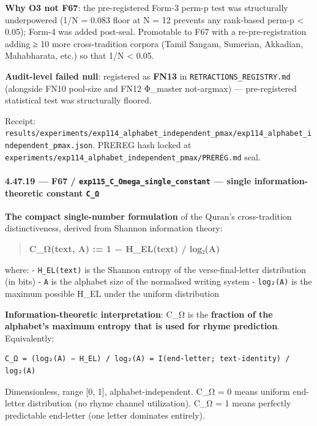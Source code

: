\documentclass[
]{article}
\begin{document}
\textbf{Why O3 not F67}: the pre-registered Form-3 perm-p test was
structurally underpowered (1/N = 0.083 floor at N = 12 prevents any
rank-based perm-p \textless{} 0.05); Form-4 was added post-seal.
Promotable to F67 with a re-pre-registration adding ≥ 10 more
cross-tradition corpora (Tamil Sangam, Sumerian, Akkadian, Mahabharata,
etc.) so that 1/N \textless{} 0.05.

\textbf{Audit-level failed null}: registered as \textbf{FN13} in
\texttt{RETRACTIONS\_REGISTRY.md} (alongside FN10 pool-size and FN12
Φ\_master not-argmax) --- pre-registered statistical test was
structurally floored.

Receipt:
\texttt{results/experiments/exp114\_alphabet\_independent\_pmax/exp114\_alphabet\_independent\_pmax.json}.
PREREG hash locked at
\texttt{experiments/exp114\_alphabet\_independent\_pmax/PREREG.md} seal.

\paragraph{\texorpdfstring{4.47.19 --- F67 /
\texttt{exp115\_C\_Omega\_single\_constant} --- single
information-theoretic constant
\texttt{C\_Ω}}{4.47.19 --- F67 / exp115\_C\_Omega\_single\_constant --- single information-theoretic constant C\_Ω}}\label{f67-exp115_c_omega_single_constant-single-information-theoretic-constant-c_ux3c9}

\textbf{The compact single-number formulation} of the Quran's
cross-tradition distinctiveness, derived from Shannon information
theory:

\begin{quote}
\textbf{C\_Ω(text, A) := 1 − H\_EL(text) / log₂(A)}
\end{quote}

where: - \texttt{H\_EL(text)} is the Shannon entropy of the
verse-final-letter distribution (in bits) - \texttt{A} is the alphabet
size of the normalised writing system - \texttt{log₂(A)} is the maximum
possible H\_EL under the uniform distribution

\textbf{Information-theoretic interpretation}: C\_Ω is the
\textbf{fraction of the alphabet's maximum entropy that is used for
rhyme prediction}. Equivalently:

\begin{verbatim}
C_Ω = (log₂(A) − H_EL) / log₂(A) = I(end-letter; text-identity) / log₂(A)
\end{verbatim}

Dimensionless, range {[}0, 1{]}, alphabet-independent. C\_Ω = 0 means
uniform end-letter distribution (no rhyme channel utilization). C\_Ω = 1
means perfectly predictable end-letter (one letter dominates entirely).
\end{document}
